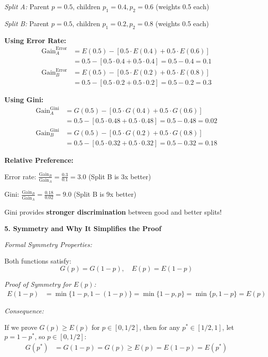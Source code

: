 \documentclass[12pt]{article}
\begin{document}
\begin{explanation}
\textit{Split A:} Parent $p=0.5$, children $p_1=0.4, p_2=0.6$ (weights 0.5 each)

\textit{Split B:} Parent $p=0.5$, children $p_1=0.2, p_2=0.8$ (weights 0.5 each)

\textbf{Using Error Rate:}
\begin{align*}
\text{Gain}_A^{\text{Error}} &= E(0.5) - [0.5 \cdot E(0.4) + 0.5 \cdot E(0.6)] \\
&= 0.5 - [0.5 \cdot 0.4 + 0.5 \cdot 0.4] = 0.5 - 0.4 = 0.1 \\
\text{Gain}_B^{\text{Error}} &= E(0.5) - [0.5 \cdot E(0.2) + 0.5 \cdot E(0.8)] \\
&= 0.5 - [0.5 \cdot 0.2 + 0.5 \cdot 0.2] = 0.5 - 0.2 = 0.3
\end{align*}

\textbf{Using Gini:}
\begin{align*}
\text{Gain}_A^{\text{Gini}} &= G(0.5) - [0.5 \cdot G(0.4) + 0.5 \cdot G(0.6)] \\
&= 0.5 - [0.5 \cdot 0.48 + 0.5 \cdot 0.48] = 0.5 - 0.48 = 0.02 \\
\text{Gain}_B^{\text{Gini}} &= G(0.5) - [0.5 \cdot G(0.2) + 0.5 \cdot G(0.8)] \\
&= 0.5 - [0.5 \cdot 0.32 + 0.5 \cdot 0.32] = 0.5 - 0.32 = 0.18
\end{align*}

\textbf{Relative Preference:}

Error rate: $\frac{\text{Gain}_B}{\text{Gain}_A} = \frac{0.3}{0.1} = 3.0$ (Split B is 3x better)

Gini: $\frac{\text{Gain}_B}{\text{Gain}_A} = \frac{0.18}{0.02} = 9.0$ (Split B is 9x better)

Gini provides \textbf{stronger discrimination} between good and better splits!

\textbf{5. Symmetry and Why It Simplifies the Proof}

\textit{Formal Symmetry Properties:}

Both functions satisfy:
\[
G(p) = G(1-p), \quad E(p) = E(1-p)
\]

\textit{Proof of Symmetry for $E(p)$:}
\begin{align*}
E(1-p) &= \min\{1-p, 1-(1-p)\} = \min\{1-p, p\} = \min\{p, 1-p\} = E(p)
\end{align*}

\textit{Consequence:}

If we prove $G(p) \geq E(p)$ for $p \in [0, 1/2]$, then for any $p^* \in [1/2, 1]$, let $p = 1 - p^*$, so $p \in [0, 1/2]$:
\begin{align*}
G(p^*) &= G(1-p) = G(p) \geq E(p) = E(1-p) = E(p^*)
\end{align*}


\end{explanation}
\end{document}
